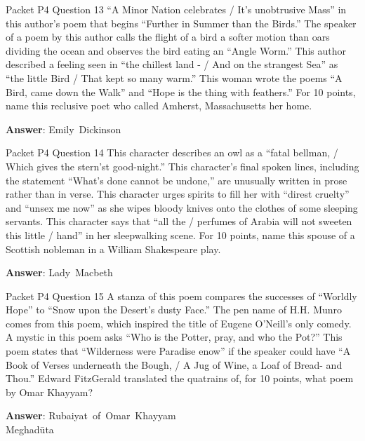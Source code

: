 \begin{frame}{Packet P4 Question 13}
“A Minor Nation celebrates / It's unobtrusive Mass” in this author’s poem that begins “Further in Summer than the Birds.” The speaker of a poem by this author calls the flight of a bird a softer motion than oars dividing the ocean and observes the bird eating an “Angle Worm.” This author described a feeling seen in “the chillest land - / And on the strangest Sea” as “the little Bird / That kept so many warm.” This woman wrote the poems “A Bird, came down the Walk” and “Hope is the thing with feathers.” For 10 points,   name this reclusive poet who called Amherst,   Massachusetts     her home.

\textbf{Answer}: Emily\ Dickinson\\
\end{frame}

\begin{frame}{Packet P4 Question 14}
This character describes an owl as a “fatal bellman, / Which gives the stern'st good-night.” This character’s final spoken lines, including the statement “What's done cannot be undone,” are unusually written in prose rather than in verse. This character urges spirits to fill her with “direst cruelty”   and ``unsex me now'' as   she wipes bloody knives onto the clothes of some sleeping servants. This character   says that “all the / perfumes of Arabia will not sweeten this little / hand” in her sleepwalking scene. For 10 points,   name this spouse of a Scottish nobleman in a William Shakespeare play.

\textbf{Answer}: Lady\ Macbeth\\
\end{frame}

\begin{frame}{Packet P4 Question 15}
A stanza of this poem compares the successes of “Worldly Hope” to “Snow upon the Desert's dusty Face.” The pen name of H.H. Munro comes from this poem, which inspired   the title of Eugene O’Neill’s only comedy. A mystic in this poem asks “Who is the Potter, pray,   and who the Pot?” This   poem states that “Wilderness were Paradise enow” if the speaker could have “A Book of Verses underneath the Bough, / A Jug of Wine, a Loaf   of Bread- and Thou.”   Edward FitzGerald translated the quatrains of, for 10 points, what poem by Omar Khayyam?

\textbf{Answer}: Rubaiyat\ of\ Omar\ Khayyam\\
 Meghadūta
\end{frame}


